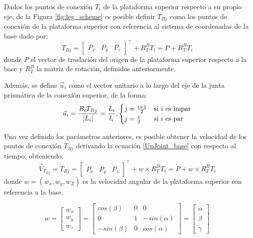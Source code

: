 Dados los puntos de conexión $T_i$ de la plataforma superior respecto a su propio eje, de la Figura \ref{fig:leg_scheme} es posible definir $T_{Bj}$ como los puntos de conexión de la plataforma superior con referencia al sistema de coordenadas de la base dado por:
\begin{equation} \label{UpJoint_base}
    T_{Bj} = \begin{bmatrix}
        P_x & P_y & P_z
    \end{bmatrix}^{\top} + R_T^B T_i = P + R_T^B T_i
\end{equation}
donde $P$ el vector de traslación del origen de la plataforma superior respecto a la base y $R_T^B$ la matriz de rotación, definidos anteriormente.

Además, se define $\vec{u}_i$ como el vector unitario a lo largo del eje de la junta prismática de la conexión superior, de la forma:
\begin{equation}
    \vec{u}_i = \frac{B_i T_{Bj}}{\lvert L_i\rvert} = \frac{L_i}{l_i} , \begin{cases}
        j = \frac{i+1}{2} & \textrm{si } i \textrm{ es impar}\\
        j = \frac{i}{2} & \textrm{si } i \textrm{ es par}
    \end{cases}
\end{equation}

Una vez definido los parámetros anteriores, es posible obtener la velocidad de los puntos de conexión $T_{Bj}$ derivando la ecuación \ref{UpJoint_base} con respecto al tiempo, obteniendo: 
\begin{equation}
    \vec{V}_{T_{Bj}} = \dot{T}_{Bj} = \begin{bmatrix}
        \dot{P}_x & \dot{P}_y & \dot{P}_z
    \end{bmatrix}^{\top} 
    + w \times R_T^B T_i = \dot{P} + w \times R_T^B T_i
\end{equation}
donde $w=(w_x, w_y, w_Z)$ es la velocidad angular de la plataforma superior con referencia a la base. 

\begin{equation}
    w = \begin{bmatrix}
        w_x \\ w_y \\ w_z
    \end{bmatrix}
    = \begin{bmatrix}
        cos(\beta) & 0 & 0 \\
        0 & 1 & -sin(\alpha)\\
        -sin(\beta) & 0 & cos(\alpha)
    \end{bmatrix}
    = \begin{bmatrix}
        \dot{\alpha} \\ \dot{\beta} \\ \dot{\gamma}
    \end{bmatrix}
\end{equation} 

